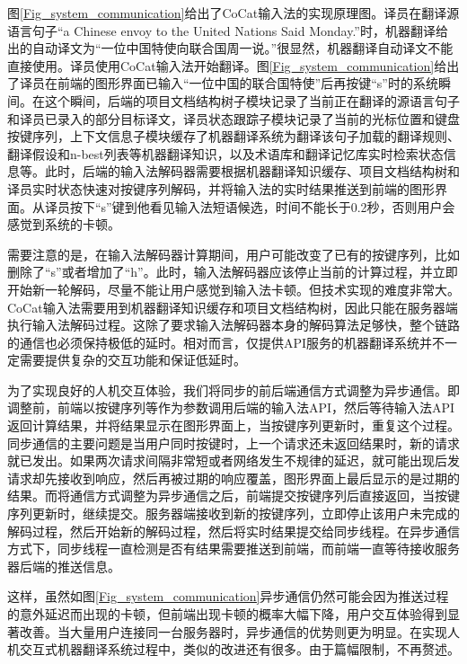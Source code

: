 图\ref{Fig_system_communication}给出了CoCat输入法的实现原理图。译员在翻译源语言句子“a Chinese envoy to the United Nations Said Monday.”时，机器翻译给出的自动译文为“一位中国特使向联合国周一说。”很显然，机器翻译自动译文不能直接使用。译员使用CoCat输入法开始翻译。图\ref{Fig_system_communication}给出了译员在前端的图形界面已输入“一位中国的联合国特使”后再按键“s”时的系统瞬间。在这个瞬间，后端的项目文档结构树子模块记录了当前正在翻译的源语言句子和译员已录入的部分目标译文，译员状态跟踪子模块记录了当前的光标位置和键盘按键序列，上下文信息子模块缓存了机器翻译系统为翻译该句子加载的翻译规则、翻译假设和n-best列表等机器翻译知识，以及术语库和翻译记忆库实时检索状态信息等。此时，后端的输入法解码器需要根据机器翻译知识缓存、项目文档结构树和译员实时状态快速对按键序列解码，并将输入法的实时结果推送到前端的图形界面。从译员按下“s”键到他看见输入法短语候选，时间不能长于0.2秒，否则用户会感觉到系统的卡顿。

需要注意的是，在输入法解码器计算期间，用户可能改变了已有的按键序列，比如删除了“s”或者增加了“h”。此时，输入法解码器应该停止当前的计算过程，并立即开始新一轮解码，尽量不能让用户感觉到输入法卡顿。但技术实现的难度非常大。CoCat输入法需要用到机器翻译知识缓存和项目文档结构树，因此只能在服务器端执行输入法解码过程。这除了要求输入法解码器本身的解码算法足够快，整个链路的通信也必须保持极低的延时。相对而言，仅提供API服务的机器翻译系统并不一定需要提供复杂的交互功能和保证低延时。

为了实现良好的人机交互体验，我们将同步的前后端通信方式调整为异步通信。即调整前，前端以按键序列等作为参数调用后端的输入法API，然后等待输入法API返回计算结果，并将结果显示在图形界面上，当按键序列更新时，重复这个过程。同步通信的主要问题是当用户同时按键时，上一个请求还未返回结果时，新的请求就已发出。如果两次请求间隔非常短或者网络发生不规律的延迟，就可能出现后发请求却先接收到响应，然后再被过期的响应覆盖，图形界面上最后显示的是过期的结果。而将通信方式调整为异步通信之后，前端提交按键序列后直接返回，当按键序列更新时，继续提交。服务器端接收到新的按键序列，立即停止该用户未完成的解码过程，然后开始新的解码过程，然后将实时结果提交给同步线程。在异步通信方式下，同步线程一直检测是否有结果需要推送到前端，而前端一直等待接收服务器后端的推送信息。

这样，虽然如图\ref{Fig_system_communication}异步通信仍然可能会因为推送过程的意外延迟而出现的卡顿，但前端出现卡顿的概率大幅下降，用户交互体验得到显著改善。当大量用户连接同一台服务器时，异步通信的优势则更为明显。在实现人机交互式机器翻译系统过程中，类似的改进还有很多。由于篇幅限制，不再赘述。

